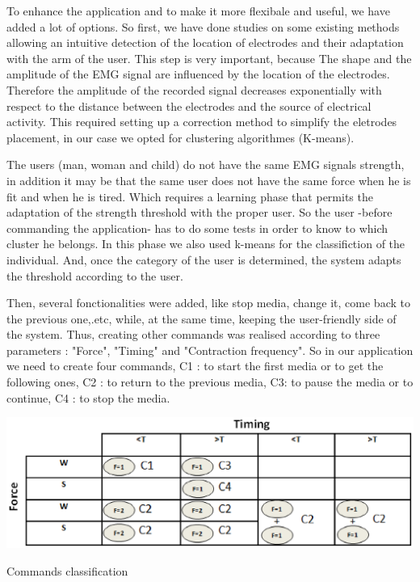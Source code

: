 \documentclass[conference]{IEEEtran}
\begin{document}
To enhance the application and to make it more flexibale and useful, we have added a lot of options. So first, we have done studies on some existing 
methods allowing an intuitive detection of the location of electrodes and their adaptation with the arm of the user. This step is very important, because The 
shape and the amplitude of the EMG signal are influenced by the location of the electrodes. Therefore the amplitude of the recorded signal decreases 
exponentially with respect to the distance between the electrodes and the source of electrical activity. This required setting up a correction method to 
simplify the eletrodes placement, in our case we opted for clustering algorithmes (K-means).\par
The users (man, woman and child) do not have the same EMG signals strength, in addition it may be that the same user does not have the same force when he is
fit and when he is tired. Which requires a learning phase that permits the adaptation of the strength threshold with the proper user. So the user -before 
commanding the application- has to do some tests in order to know to which cluster he belongs. In this phase we also used k-means for the classifiction of
the individual. And, once the category of the user is determined, the system adapts the threshold according to the user.\par
Then, several fonctionalities were added, like stop media, change it, come back to the previous one,.etc, while, at the same time, keeping the user-friendly side of the system. 
Thus, creating other commands was realised according to three parameters : "Force", "Timing" and "Contraction frequency". So in our application we need to 
create four commands, C1 : to start the first media or to get the following ones, C2 : to return to the previous media, C3: to pause the media or to continue,
C4 : to stop the media.

\begin{table}[h]
    \hspace*{0 cm}
    \includegraphics[scale=0.50]{Figures/Tableau.eps}
    \caption{Commands classification}
    \label{tab:classification}
\end{table}
\end{document}
